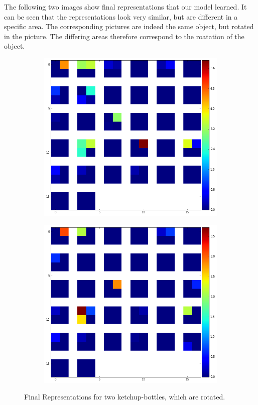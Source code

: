 \documentclass[	DIV=calc,%
				paper=a4,%
				fontsize=11pt,%
				twocolumn]{scrartcl}	 %
\begin{document}
The following two images show final representations that our model learned. It can be seen that the representations look very similar, but are different in a specific area. The corresponding pictures are indeed the same object, but rotated in the picture. The differing areas therefore correspond to the roatation of the object.

\begin{figure}[H]
    \centering
    \begin{subfigure}[b]{0.45\linewidth}
        \includegraphics[width=\linewidth]{data/final_1.png}
    \end{subfigure}
    \hfill
    \begin{subfigure}[b]{0.45\linewidth}
        \includegraphics[width=\linewidth]{data/final_2.png}
    \end{subfigure}
    \caption{Final Representations for two ketchup-bottles, which are rotated.}
    \label{}
\end{figure}
\end{document}
